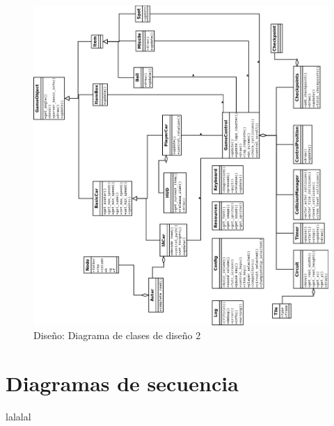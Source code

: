 \begin{figure}[H]
  \label{diagrama_clases_diseno}
  \begin{center}
    \includegraphics[scale=0.45]{imagenes/diseno/diagrama_clases_diseno2.png}
  \end{center}
  \caption{Diseño: Diagrama de clases de diseño 2}
\end{figure}

\section{Diagramas de secuencia}
lalalal
